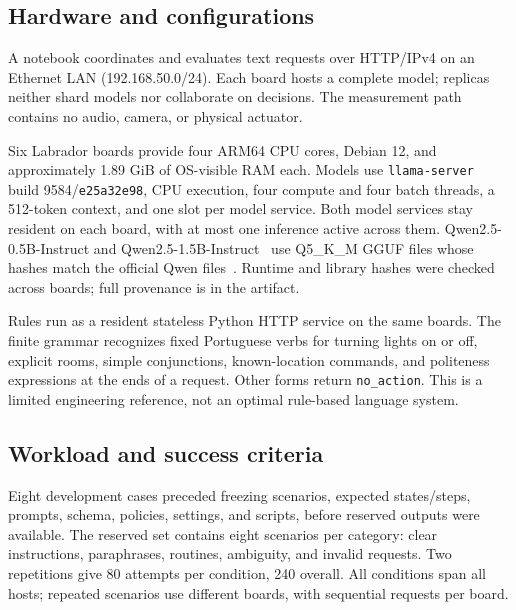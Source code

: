 \documentclass[letterpaper,conference]{IEEEtran}
\begin{document}
\subsection{Hardware and configurations}
A notebook coordinates and evaluates text requests over HTTP/IPv4 on an Ethernet LAN (192.168.50.0/24). Each board hosts a complete model; replicas neither shard models nor collaborate on decisions. The measurement path contains no audio, camera, or physical actuator.

Six Labrador boards provide four ARM64 CPU cores, Debian 12, and approximately 1.89 GiB of OS-visible RAM each. Models use \texttt{llama-server}~\cite{llamaserver} build 9584/\texttt{e25a32e98}, CPU execution, four compute and four batch threads, a 512-token context, and one slot per model service. Both model services stay resident on each board, with at most one inference active across them. Qwen2.5-0.5B-Instruct and Qwen2.5-1.5B-Instruct~\cite{qwen05,qwen15} use Q5\_K\_M GGUF files whose hashes match the official Qwen files~\cite{qwen05gguf,qwen15gguf}. Runtime and library hashes were checked across boards; full provenance is in the artifact.

Rules run as a resident stateless Python HTTP service on the same boards. The finite grammar recognizes fixed Portuguese verbs for turning lights on or off, explicit rooms, simple conjunctions, known-location commands, and politeness expressions at the ends of a request. Other forms return \texttt{no\_action}. This is a limited engineering reference, not an optimal rule-based language system.

\subsection{Workload and success criteria}
Eight development cases preceded freezing scenarios, expected states/steps, prompts, schema, policies, settings, and scripts, before reserved outputs were available. The reserved set contains eight scenarios per category: clear instructions, paraphrases, routines, ambiguity, and invalid requests. Two repetitions give 80 attempts per condition, 240 overall. All conditions span all hosts; repeated scenarios use different boards, with sequential requests per board.
\end{document}
